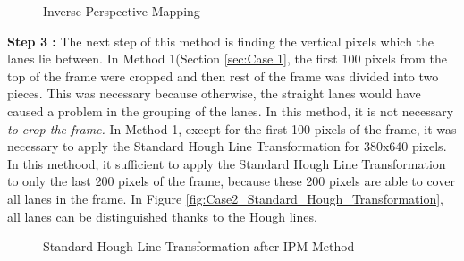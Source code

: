  
\begin{figure}[H]
  \centering
  \hfill
  \caption{Inverse Perspective Mapping}
\end{figure} 


\textbf{Step 3 : }The next step of this method is finding the vertical pixels which the lanes lie between. In Method 1(Section \ref{sec:Case 1}, the first 100 pixels from the top of the frame were cropped and then rest of the frame was divided into two pieces. This was necessary because otherwise, the straight lanes would have caused a problem in the grouping of the lanes. In this method, it is not necessary \emph{\color{green}to crop the frame.} In Method 1, except for the first 100 pixels of the frame, it was necessary to apply the Standard Hough Line Transformation for 380x640 pixels. In this methood, it sufficient to apply the Standard Hough Line Transformation to only the last 200 pixels of the frame, because these 200 pixels are able to cover all lanes in the frame. In Figure \ref{fig:Case2_Standard_Hough_Transformation}, all lanes can be distinguished thanks to the Hough lines. 


\begin{figure}[H]
  \centering
  \caption{Standard Hough Line Transformation after IPM Method}
\end{figure} 



